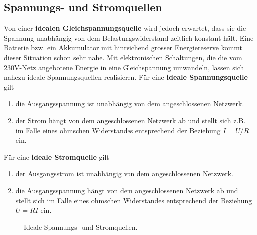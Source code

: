\subsection{Spannungs- und Stromquellen}
Von einer \textbf{idealen Gleichspannungsquelle} wird jedoch erwartet, dass sie die Spannung unabhängig von dem Belastungswiderstand zeitlich konstant hält. Eine Batterie bzw. ein Akkumulator mit hinreichend grosser Energiereserve kommt dieser Situation schon sehr nahe. Mit elektronischen Schaltungen, die die vom 230V-Netz angebotene Energie in eine Gleichspannung  umwandeln, lassen sich nahezu ideale Spannungsquellen realisieren.
\newline\newline
Für eine \textbf{ideale Spannungsquelle} gilt
\begin{enumerate}[$(i)$]
\item die Ausgangsspannung ist unabhängig von dem angeschlossenen Netzwerk.
\item der Strom hängt von dem angeschlossenen Netzwerk ab und stellt sich z.B. im Falle eines ohmschen Widerstandes entsprechend der Beziehung $I=U/R$ ein.
\end{enumerate}
Für eine \textbf{ideale Stromquelle} gilt
\begin{enumerate}[$(i)$]
\item der Ausgangsstrom ist unabhängig von dem angeschlossenen Netzwerk.
\item die Ausgangsspannung hängt von dem angeschlossenen Netzwerk ab und stellt sich im Falle eines ohmschen Widerstandes entsprechend der Beziehung $U=RI$ ein.
\end{enumerate}
\begin{figure}[H]
\centering
\caption{Ideale Spannungs- und Stromquellen.}
\label{fig_IIId}
\end{figure}
